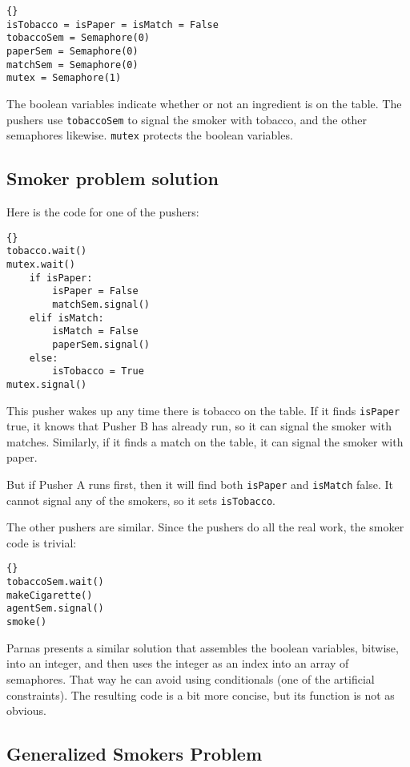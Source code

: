 \documentclass{book}
\newcommand{\clearemptydoublepage}{\newpage\cleardoublepage}
\begin{document}
\begin{lstlisting}[title={Smokers problem hint}]{}
isTobacco = isPaper = isMatch = False
tobaccoSem = Semaphore(0)
paperSem = Semaphore(0)
matchSem = Semaphore(0)
mutex = Semaphore(1)
\end{lstlisting}

The boolean variables indicate whether or not an ingredient
is on the table.  The pushers use {\tt tobaccoSem} to signal
the smoker with tobacco, and the other semaphores likewise.
{\tt mutex} protects the boolean variables.


\clearemptydoublepage
\subsection{Smoker problem solution}

Here is the code for one of the pushers:

\begin{lstlisting}[title={Pusher A}]{}
tobacco.wait()
mutex.wait()
    if isPaper:
        isPaper = False
        matchSem.signal()
    elif isMatch:
        isMatch = False
        paperSem.signal()
    else: 
        isTobacco = True
mutex.signal()
\end{lstlisting}

This pusher wakes up any time there is tobacco on the
table.  If it finds {\tt isPaper} true, it knows that
Pusher B has already run, so it can signal the smoker
with matches.  Similarly, if it finds a match on the
table, it can signal the smoker with paper.

But if Pusher A runs first, then it will find both
{\tt isPaper} and {\tt isMatch} false.  It cannot signal
any of the smokers, so it sets {\tt isTobacco}.

The other pushers are similar.  Since the pushers do all
the real work, the smoker code is trivial:

\begin{lstlisting}[title={Smoker with tobacco}]{}
tobaccoSem.wait()
makeCigarette()
agentSem.signal()
smoke()
\end{lstlisting}

Parnas presents a similar solution that assembles the
boolean variables, bitwise, into an integer, and then
uses the integer as an index into an array of semaphores.
That way he can avoid using conditionals (one of the
artificial constraints).  The resulting code is a bit
more concise, but its function is not as obvious.


\subsection{Generalized Smokers Problem}
\end{document}
